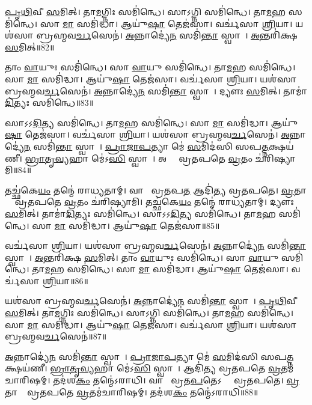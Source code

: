 \ul{𑌪𑍃}\ul{𑌥𑌿}𑌵𑍀 \ul{𑌸}𑌮𑌿𑌤𑍍। 
𑌤𑌾\ul{𑌮}𑌗𑍍𑌨𑌿𑌃 𑌸𑌮𑌿॑𑌨𑍍𑌧𑍇। 
𑌸𑌾𑌽𑌗𑍍𑌨𑌿 𑌸𑌮𑌿॑𑌨𑍍𑌧𑍇। 
𑌤𑌾\ul{𑌮}𑌹 𑌸𑌮𑌿॑𑌨𑍍𑌧𑍇। 
𑌸𑌾 \ul{𑌮𑌾} 𑌸𑌮𑌿॑𑌦𑍍𑌧𑌾। 
𑌆𑌯𑍁॑\ul{𑌷𑌾} 𑌤𑍇𑌜॑𑌸𑌾। 
𑌵𑌰𑍍𑌚॑𑌸𑌾 \ul{𑌶𑍍𑌰𑌿}𑌯𑌾। 
𑌯𑌶॑𑌸𑌾 𑌬𑍍𑌰𑌹𑍍𑌮𑌵\ul{𑌰𑍍𑌚}𑌸𑍇𑌨॑। 
\ul{𑌅}𑌨𑍍𑌨𑌾𑌦𑍍𑌯𑍇॑\ul{𑌨} 𑌸𑌮𑌿॑\ul{𑌨𑍍𑌤𑌾}\ul{} 𑌸𑍍𑌵𑌾𑌹𑌾᳚। 
\ul{𑌅}𑌨𑍍𑌤𑌰𑌿॑𑌕𑍍𑌷 \ul{𑌸}𑌮𑌿𑌤𑍍॥82॥

𑌤𑌾𑌂 \ul{𑌵𑌾}𑌯𑍁𑌃 𑌸𑌮𑌿॑𑌨𑍍𑌧𑍇। 
𑌸𑌾 \ul{𑌵𑌾}𑌯𑍁 𑌸𑌮𑌿॑𑌨𑍍𑌧𑍇। 
𑌤𑌾\ul{𑌮}𑌹 𑌸𑌮𑌿॑𑌨𑍍𑌧𑍇। 
𑌸𑌾 \ul{𑌮𑌾} 𑌸𑌮𑌿॑𑌦𑍍𑌧𑌾। 
𑌆𑌯𑍁॑\ul{𑌷𑌾} 𑌤𑍇𑌜॑𑌸𑌾। 
𑌵𑌰𑍍𑌚॑𑌸𑌾 \ul{𑌶𑍍𑌰𑌿}𑌯𑌾। 
𑌯𑌶॑𑌸𑌾 𑌬𑍍𑌰𑌹𑍍𑌮𑌵\ul{𑌰𑍍𑌚}𑌸𑍇𑌨॑। 
\ul{𑌅}𑌨𑍍𑌨𑌾𑌦𑍍𑌯𑍇॑\ul{𑌨} 𑌸𑌮𑌿॑\ul{𑌨𑍍𑌤𑌾}\ul{} 𑌸𑍍𑌵𑌾𑌹𑌾᳚। 
𑌦𑍍𑌯𑍗𑌃 \ul{𑌸}𑌮𑌿𑌤𑍍। 
𑌤𑌾𑌮𑌾॑\ul{𑌦𑌿}𑌤𑍍𑌯𑌃 𑌸𑌮𑌿॑𑌨𑍍𑌧𑍇॥83॥

𑌸𑌾𑌽𑌽\ul{𑌦𑌿}𑌤𑍍𑌯 𑌸𑌮𑌿॑𑌨𑍍𑌧𑍇। 
𑌤𑌾\ul{𑌮}𑌹 𑌸𑌮𑌿॑𑌨𑍍𑌧𑍇। 
𑌸𑌾 \ul{𑌮𑌾} 𑌸𑌮𑌿॑𑌦𑍍𑌧𑌾। 
𑌆𑌯𑍁॑\ul{𑌷𑌾} 𑌤𑍇𑌜॑𑌸𑌾। 
𑌵𑌰𑍍𑌚॑𑌸𑌾 \ul{𑌶𑍍𑌰𑌿}𑌯𑌾। 
𑌯𑌶॑𑌸𑌾 𑌬𑍍𑌰𑌹𑍍𑌮𑌵\ul{𑌰𑍍𑌚}𑌸𑍇𑌨॑। 
\ul{𑌅}𑌨𑍍𑌨𑌾𑌦𑍍𑌯𑍇॑\ul{𑌨} 𑌸𑌮𑌿॑\ul{𑌨𑍍𑌤𑌾}\ul{} 𑌸𑍍𑌵𑌾𑌹𑌾᳚। 
\ul{𑌪𑍍𑌰𑌾}\ul{𑌜𑌾}\ul{𑌪}𑌤𑍍𑌯𑌾 𑌮𑍇॑ \ul{𑌸}𑌮𑌿𑌦॑𑌸𑌿 𑌸𑌪\ul{𑌤𑍍𑌨}𑌕𑍍𑌷𑌯॑𑌣𑍀। 
\ul{𑌭𑍍𑌰𑌾}\ul{𑌤𑍃}\ul{𑌵𑍍𑌯}𑌹𑌾 𑌮𑍇॑𑌽\ul{𑌸𑌿} 𑌸𑍍𑌵𑌾𑌹𑌾᳚। 
𑌅𑌗𑍍𑌨𑍇᳚ 𑌵𑍍𑌰𑌤𑌪𑌤𑍇 \ul{𑌵𑍍𑌰}𑌤𑌂 𑌚॑𑌰𑌿𑌷𑍍𑌯𑌾𑌮𑌿॥84॥

𑌤𑌚𑍍𑌛॑𑌕𑍇\ul{𑌯𑌂} 𑌤𑌨𑍍𑌮𑍇॑ 𑌰𑌾𑌧𑍍𑌯𑌤𑌾𑌮𑍍। 
𑌵𑌾𑌯𑍋᳚ 𑌵𑍍𑌰𑌤𑌪\ul{𑌤} 𑌆𑌦𑌿॑𑌤𑍍𑌯 𑌵𑍍𑌰𑌤𑌪𑌤𑍇। 
\ul{𑌵𑍍𑌰}𑌤𑌾𑌨𑌾𑌂᳚ 𑌵𑍍𑌰𑌤𑌪𑌤𑍇 \ul{𑌵𑍍𑌰}𑌤𑌂 𑌚॑𑌰𑌿𑌷𑍍𑌯𑌾𑌮𑌿। 
𑌤𑌚𑍍𑌛॑𑌕𑍇\ul{𑌯𑌂} 𑌤𑌨𑍍𑌮𑍇॑ 𑌰𑌾𑌧𑍍𑌯𑌤𑌾𑌮𑍍। 
𑌦𑍍𑌯𑍗𑌃 \ul{𑌸}𑌮𑌿𑌤𑍍। 
𑌤𑌾𑌮𑌾॑\ul{𑌦𑌿}𑌤𑍍𑌯𑌃 𑌸𑌮𑌿॑𑌨𑍍𑌧𑍇। 
𑌸𑌾𑌽𑌽\ul{𑌦𑌿}𑌤𑍍𑌯 𑌸𑌮𑌿॑𑌨𑍍𑌧𑍇। 
𑌤𑌾\ul{𑌮}𑌹 𑌸𑌮𑌿॑𑌨𑍍𑌧𑍇। 
𑌸𑌾 \ul{𑌮𑌾} 𑌸𑌮𑌿॑𑌦𑍍𑌧𑌾। 
𑌆𑌯𑍁॑\ul{𑌷𑌾} 𑌤𑍇𑌜॑𑌸𑌾॥85॥

𑌵𑌰𑍍𑌚॑𑌸𑌾 \ul{𑌶𑍍𑌰𑌿}𑌯𑌾। 
𑌯𑌶॑𑌸𑌾 𑌬𑍍𑌰𑌹𑍍𑌮𑌵\ul{𑌰𑍍𑌚}𑌸𑍇𑌨॑। 
\ul{𑌅}𑌨𑍍𑌨𑌾𑌦𑍍𑌯𑍇॑\ul{𑌨} 𑌸𑌮𑌿॑\ul{𑌨𑍍𑌤𑌾}\ul{} 𑌸𑍍𑌵𑌾𑌹𑌾᳚। 
\ul{𑌅}𑌨𑍍𑌤𑌰𑌿॑𑌕𑍍𑌷 \ul{𑌸}𑌮𑌿𑌤𑍍। 
𑌤𑌾𑌂 \ul{𑌵𑌾}𑌯𑍁𑌃 𑌸𑌮𑌿॑𑌨𑍍𑌧𑍇। 
𑌸𑌾 \ul{𑌵𑌾}𑌯𑍁 𑌸𑌮𑌿॑𑌨𑍍𑌧𑍇। 
𑌤𑌾\ul{𑌮}𑌹 𑌸𑌮𑌿॑𑌨𑍍𑌧𑍇। 
𑌸𑌾 \ul{𑌮𑌾} 𑌸𑌮𑌿॑𑌦𑍍𑌧𑌾। 
𑌆𑌯𑍁॑\ul{𑌷𑌾} 𑌤𑍇𑌜॑𑌸𑌾। 
𑌵𑌰𑍍𑌚॑𑌸𑌾 \ul{𑌶𑍍𑌰𑌿}𑌯𑌾॥86॥

𑌯𑌶॑𑌸𑌾 𑌬𑍍𑌰𑌹𑍍𑌮𑌵\ul{𑌰𑍍𑌚}𑌸𑍇𑌨॑। 
\ul{𑌅}𑌨𑍍𑌨𑌾𑌦𑍍𑌯𑍇॑\ul{𑌨} 𑌸𑌮𑌿॑\ul{𑌨𑍍𑌤𑌾}\ul{} 𑌸𑍍𑌵𑌾𑌹𑌾᳚। 
\ul{𑌪𑍃}\ul{𑌥𑌿}𑌵𑍀 \ul{𑌸}𑌮𑌿𑌤𑍍। 
𑌤𑌾\ul{𑌮}𑌗𑍍𑌨𑌿𑌃 𑌸𑌮𑌿॑𑌨𑍍𑌧𑍇। 
𑌸𑌾𑌽𑌗𑍍𑌨𑌿 𑌸𑌮𑌿॑𑌨𑍍𑌧𑍇। 
𑌤𑌾\ul{𑌮}𑌹 𑌸𑌮𑌿॑𑌨𑍍𑌧𑍇। 
𑌸𑌾 \ul{𑌮𑌾} 𑌸𑌮𑌿॑𑌦𑍍𑌧𑌾। 
𑌆𑌯𑍁॑\ul{𑌷𑌾} 𑌤𑍇𑌜॑𑌸𑌾। 
𑌵𑌰𑍍𑌚॑𑌸𑌾 \ul{𑌶𑍍𑌰𑌿}𑌯𑌾। 
𑌯𑌶॑𑌸𑌾 𑌬𑍍𑌰𑌹𑍍𑌮𑌵\ul{𑌰𑍍𑌚}𑌸𑍇𑌨॑॥87॥

\ul{𑌅}𑌨𑍍𑌨𑌾𑌦𑍍𑌯𑍇॑\ul{𑌨} 𑌸𑌮𑌿॑\ul{𑌨𑍍𑌤𑌾}\ul{} 𑌸𑍍𑌵𑌾𑌹𑌾᳚। 
\ul{𑌪𑍍𑌰𑌾}\ul{𑌜𑌾}\ul{𑌪}𑌤𑍍𑌯𑌾 𑌮𑍇॑ \ul{𑌸}𑌮𑌿𑌦॑𑌸𑌿 𑌸𑌪\ul{𑌤𑍍𑌨}𑌕𑍍𑌷𑌯॑𑌣𑍀। 
\ul{𑌭𑍍𑌰𑌾}\ul{𑌤𑍃}\ul{𑌵𑍍𑌯}𑌹𑌾 𑌮𑍇॑𑌽\ul{𑌸𑌿} 𑌸𑍍𑌵𑌾𑌹𑌾᳚। 
𑌆𑌦𑌿॑𑌤𑍍𑌯 𑌵𑍍𑌰𑌤𑌪𑌤𑍇 \ul{𑌵𑍍𑌰}𑌤𑌮॑𑌚𑌾𑌰𑌿𑌷𑌮𑍍। 
𑌤𑌦॑𑌶\ul{𑌕𑌂} 𑌤𑌨𑍍𑌮𑍇॑𑌽𑌰𑌾𑌧𑌿। 
𑌵𑌾𑌯𑍋᳚ 𑌵𑍍𑌰𑌤\ul{𑌪}𑌤𑍇𑌽𑌗𑍍𑌨𑍇᳚ 𑌵𑍍𑌰𑌤𑌪𑌤𑍇। 
\ul{𑌵𑍍𑌰}𑌤𑌾𑌨𑌾𑌂᳚ 𑌵𑍍𑌰𑌤𑌪𑌤𑍇 \ul{𑌵𑍍𑌰}𑌤𑌮॑𑌚𑌾𑌰𑌿𑌷𑌮𑍍। 
𑌤𑌦॑𑌶\ul{𑌕𑌂} 𑌤𑌨𑍍𑌮𑍇॑𑌽𑌰𑌾𑌧𑌿॥88॥
\anuvakamend[\ul{𑌸}𑌮𑌿𑌥𑍍𑌸𑌮𑌿॑𑌨𑍍𑌧𑍇 \ul{𑌵𑍍𑌰}𑌤𑌂 𑌚॑𑌰𑌿\ul{𑌷𑍍𑌯𑌾}𑌮𑍍𑌯𑌾𑌯𑍁॑\ul{𑌷𑌾} 𑌤𑍇𑌜॑\ul{𑌸𑌾} 𑌵𑌰𑍍𑌚॑𑌸𑌾 \ul{𑌶𑍍𑌰𑌿}𑌯𑌾 𑌯𑌶॑𑌸𑌾 𑌬𑍍𑌰𑌹𑍍𑌮𑌵\ul{𑌰𑍍𑌚}𑌸𑍇\ul{𑌨𑌾}𑌷𑍍𑌟𑍗 𑌚॑]


